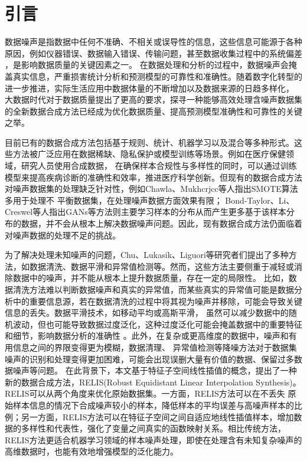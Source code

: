 \documentclass[12pt,a4paper]{article}%
\begin{document}
	\section{引言}
	数据噪声是指数据中任何不准确、不相关或误导性的信息，这些信息可能源于各种原因，例如仪器错误、数据输入错误、传输问题，甚至数据收集过程中的系统偏差 ，是影响数据质量的关键因素之一\cite{bib1}。
	在数据处理和分析的过程中，数据噪声会掩盖真实信息，严重损害统计分析和预测模型的可靠性和准确性。随着数字化转型的进一步推进，实际生活应用中数据体量的不断增加以及数据来源的日趋多样化，
	大数据时代对于数据质量提出了更高的要求，探寻一种能够高效处理含噪声数据集的全新数据合成方法已经成为优化数据质量、提高预测模型准确性和可靠性的关键之举。

	目前已有的数据合成方法包括基于规则、统计、机器学习以及混合等多种形式。这些方法被广泛应用在数据稀缺、隐私保护或模型训练等场景。例如在医疗保健领域，研究人员使用合成数据，
	在确保样本合规性与多样性的同时，可以通过训练模型来提高疾病诊断的准确性和效率，推进医疗科学创新。但现有的数据合成方法对噪声数据集的处理缺乏针对性，例如Chawla\cite{bib2}、Mukhcrjcc\cite{bib3}等人指出SMOTE算法多用于处理不
	平衡数据集，在处理噪声数据方面效果有限； Bond-Taylor\cite{bib4}、Li\cite{bib5}、Creswel\cite{bib6}等人指出GANs等方法则主要学习样本的分布从而产生更多基于该样本分布的数据，并不会从根本上解决数据噪声问题。因此，现有数据合成方法仍面临着对噪声数据的处理不足的挑战。
	
	为了解决处理未知噪声的问题，Chu\cite{bib7}、Lukasik\cite{bib8}、Liguori\cite{bib9}等研究者们提出了多种方法，如数据清洗、数据平滑和异常值检测等。然而，这些方法主要侧重于减轻或消除数据中的噪声，并不能从根本上提升数据质量，存在一定的局限性。
	比如，数据清洗方法难以判断数据噪声和真实的异常值，而某些真实的异常值可能是数据分析中的重要信息源，若在数据清洗的过程中将其视为噪声并移除，可能会导致关键信息的丢失\cite{bib10}。数据平滑技术，如移动平均或高斯平滑，
	虽然可以减少数据中的随机波动，但也可能导致数据过度泛化，这种过度泛化可能会掩盖数据中的重要特征和细节，影响数据分析的准确性 \cite{bib11}。此外，在复杂或更高维度的数据中，噪声和有用信息之间的界限变得更为模糊，数据清理、
	异常值检测\cite{bib12}等降噪方法对于数据集噪声的识别和处理变得更加困难，可能会出现误删大量有价值的数据、保留过多数据噪声等问题。
	在此背景下，本文基于特征子空间线性插值的概念，提出了一种新的数据合成方法，RELIS(Robust Equidistant Linear Interpolation Synthesis)。RELIS可以从两个角度来优化原始数据集。一方面，RELIS方法可以在不丢失
	原始样本信息的情况下合成噪声较小的样本，降低样本的平均误差与高噪声样本的比例；另一方面，RELIS方法可以在特征子空间之间自适应地线性插值样本，增加数据的多样性和代表性，强化了变量之间真实的函数映射关系。相比传统方法，
	RELIS方法更适合机器学习领域的样本噪声处理，即使在处理含有未知复杂噪声的高维数据时，也能有效地增强模型的泛化能力。
	
\end{document}
